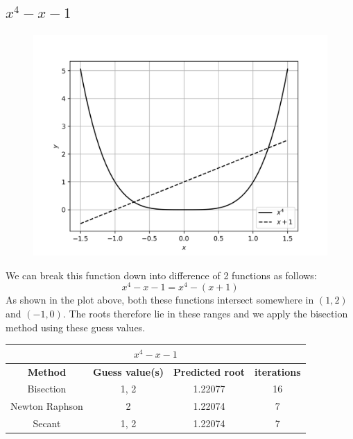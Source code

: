 \documentclass[12,a4paper]{article}
\begin{document}
    \subsection{$x^4 - x - 1$}
    \begin{figure}[H]
        \centering
        \includegraphics[width = \textwidth]{plots/p10.png}
        \label{fig:my_label}
    \end{figure}
    We can break this function down into difference of 2 functions as follows:
    \begin{equation}
        x^4 - x - 1 = x^4 - (x+1)
    \end{equation}
    As shown in the plot above, both these functions intersect somewhere in $(1, 2)$ and $(-1, 0)$. The roots therefore lie in these ranges and we apply the bisection method using these guess values.
    \begin{table}[h!]
        \centering
        \begin{tabular}{|c|c c c|} 
            \hline
            \multicolumn{4}{|c|}{$x^4 - x - 1$}\\
            \hline
            \textbf{Method}&\textbf{Guess value(s)}&\textbf{Predicted root}&\textbf{iterations} \\ [0.5ex] 
            \hline
            Bisection & 1, 2 & 1.22077 & 16 \\ 
            Newton Raphson & 2 & 1.22074 & 7 \\
            Secant &  1, 2 & 1.22074 & 7 \\[1ex] 
            \hline
        \end{tabular}
    \end{table}
\end{document}
